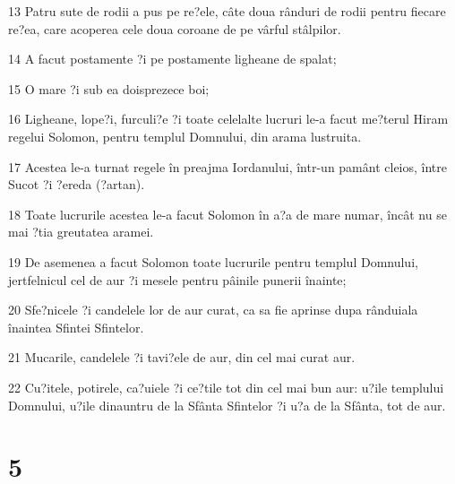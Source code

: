 \par 13 Patru sute de rodii a pus pe re?ele, câte doua rânduri de rodii pentru fiecare re?ea, care acoperea cele doua coroane de pe vârful stâlpilor.
\par 14 A facut postamente ?i pe postamente ligheane de spalat;
\par 15 O mare ?i sub ea doisprezece boi;
\par 16 Ligheane, lope?i, furculi?e ?i toate celelalte lucruri le-a facut me?terul Hiram regelui Solomon, pentru templul Domnului, din arama lustruita.
\par 17 Acestea le-a turnat regele în preajma Iordanului, într-un pamânt cleios, între Sucot ?i ?ereda (?artan).
\par 18 Toate lucrurile acestea le-a facut Solomon în a?a de mare numar, încât nu se mai ?tia greutatea aramei.
\par 19 De asemenea a facut Solomon toate lucrurile pentru templul Domnului, jertfelnicul cel de aur ?i mesele pentru pâinile punerii înainte;
\par 20 Sfe?nicele ?i candelele lor de aur curat, ca sa fie aprinse dupa rânduiala înaintea Sfintei Sfintelor.
\par 21 Mucarile, candelele ?i tavi?ele de aur, din cel mai curat aur.
\par 22 Cu?itele, potirele, ca?uiele ?i ce?tile tot din cel mai bun aur: u?ile templului Domnului, u?ile dinauntru de la Sfânta Sfintelor ?i u?a de la Sfânta, tot de aur.

\chapter{5}

